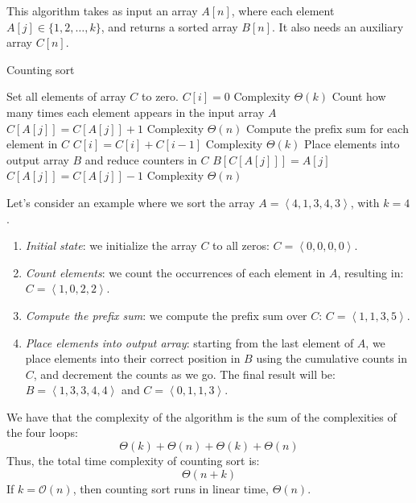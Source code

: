 This algorithm takes as input an array $A[n]$, where each element $A[j]\in\{1, 2, \dots, k\}$, and returns a sorted array $B[n]$.
It also needs an auxiliary array $C[n]$. 
\begin{algorithm}[H]
    \caption{Counting sort}
    \begin{algorithmic}[1]
         \Comment Set all elements of array $C$ to zero.
            \State $C[i]=0$ 
        \EndFor \Comment Complexity $\Theta(k)$
         \Comment Count how many times each element appears in the input array $A$
            \State $C[A[j]]=C[A[j]]+1$ 
        \EndFor \Comment Complexity $\Theta(n)$
         \Comment Compute the prefix sum for each element in $C$
            \State $C[i]=C[i]+C[i-1]$ 
        \EndFor \Comment Complexity $\Theta(k)$
         \Comment Place elements into output array $B$ and reduce counters in $C$
            \State $B[C[A[j]]]=A[j]$
            \State $C[A[j]]=C[A[j]]-1$ 
        \EndFor \Comment Complexity $\Theta(n)$
    \end{algorithmic}
\end{algorithm}  
\begin{example}
    Let's consider an example where we sort the array $A=\left\langle 4, 1, 3, 4, 3\right\rangle$, with $k=4$. 
    \begin{enumerate}
        \item \textit{Initial state}: we initialize the array $C$ to all zeros: $C=\left\langle 0,0,0,0\right\rangle$.
        \item \textit{Count elements}: we count the occurrences of each element in $A$, resulting in: $C=\left\langle 1,0,2,2\right\rangle$.
        \item \textit{Compute the prefix sum}: we compute the prefix sum over $C$: $C=\left\langle 1,1,3,5\right\rangle$.
        \item \textit{Place elements into output array}: starting from the last element of $A$, we place elements into their correct position in $B$ using the cumulative counts in $C$, and decrement the counts as we go. 
            The final result will be: $B=\left\langle 1,3,3,4,4\right\rangle$ and $C=\left\langle 0,1,1,3\right\rangle$.
    \end{enumerate}
\end{example}
We have that the complexity of the algorithm is the sum of the complexities of the four loops: 
\[\Theta(k)+\Theta(n)+\Theta(k)+\Theta(n)\]
Thus, the total time complexity of counting sort is: 
\[\Theta(n+k)\]
If $k = \mathcal{O}(n)$, then counting sort runs in linear time, $\Theta(n)$.

